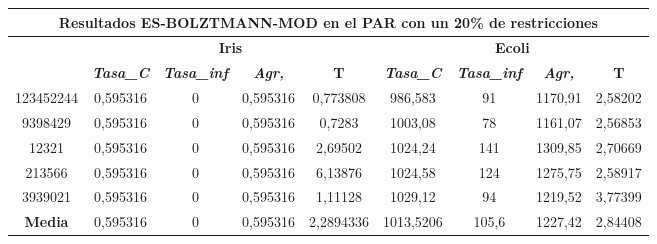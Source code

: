 \documentclass[12pt, spanish]{article}
\begin{document}
\begin{table}[H]
\begin{tabular}{|c|c|c|c|c|c|c|c|c|}
\hline
\multicolumn{9}{|c|}{\textbf{Resultados ES-BOLZTMANN-MOD en el PAR con un 20\% de restricciones}}                                                                                                                 \\ \hline
\multirow{2}{*}{} & \multicolumn{4}{c|}{\textbf{Iris}}                                                            & \multicolumn{4}{c|}{\textbf{Ecoli}}                                                           \\ \cline{2-9} 
                  & \textit{\textbf{Tasa\_C}} & \textit{\textbf{Tasa\_inf}} & \textit{\textbf{Agr,}} & \textbf{T} & \textit{\textbf{Tasa\_C}} & \textit{\textbf{Tasa\_inf}} & \textit{\textbf{Agr,}} & \textbf{T} \\ \hline
123452244         & 0,595316                  & 0                           & 0,595316               & 0,773808   & 986,583                   & 91                          & 1170,91                & 2,58202    \\ \hline
9398429           & 0,595316                  & 0                           & 0,595316               & 0,7283     & 1003,08                   & 78                          & 1161,07                & 2,56853    \\ \hline
12321             & 0,595316                  & 0                           & 0,595316               & 2,69502    & 1024,24                   & 141                         & 1309,85                & 2,70669    \\ \hline
213566            & 0,595316                  & 0                           & 0,595316               & 6,13876    & 1024,58                   & 124                         & 1275,75                & 2,58917    \\ \hline
3939021           & 0,595316                  & 0                           & 0,595316               & 1,11128    & 1029,12                   & 94                          & 1219,52                & 3,77399    \\ \hline
\textbf{Media}    & 0,595316                  & 0                           & 0,595316               & 2,2894336  & 1013,5206                 & 105,6                       & 1227,42                & 2,84408    \\ \hline
\end{tabular}
\end{table}
\end{document}
